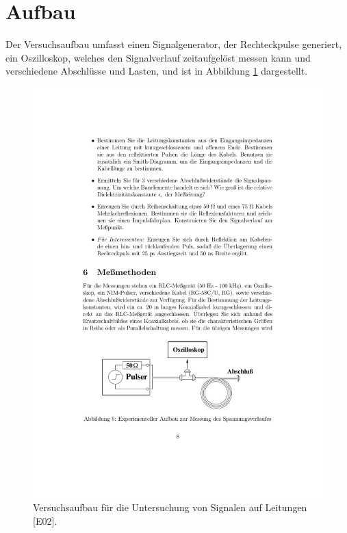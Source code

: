 \section{Aufbau} %
\label{sec:aufbau}
Der Versuchsaufbau umfasst einen Signalgenerator, der Rechteckpulse generiert,
ein Oszilloskop, welches den Signalverlauf zeitaufgelöst messen kann und
verschiedene Abschlüsse und Lasten, und ist in Abbildung \ref{fig:aufbau}
dargestellt.
\begin{figure}
    \centering
    \includegraphics[width=0.7\linewidth]{img/aufbau.pdf}
    \caption{
        Versuchsaufbau für die Untersuchung von Signalen auf Leitungen
        [E02].
    }
    \label{fig:aufbau}
\end{figure}

